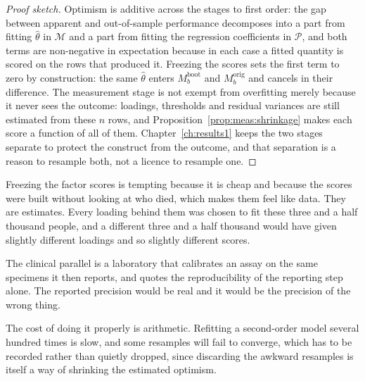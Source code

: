 \begin{proof}[Proof sketch]
Optimism is additive across the stages to first order: the gap between apparent
and out-of-sample performance decomposes into a part from fitting
$\widehat\theta$ in $\mathcal M$ and a part from fitting the regression
coefficients in $\mathcal P$, and both terms are non-negative in expectation
because in each case a fitted quantity is scored on the rows that produced it.
Freezing the scores sets the first term to zero by construction: the same
$\widehat\theta$ enters $M_b^{\mathrm{boot}}$ and $M_b^{\mathrm{orig}}$ and
cancels in their difference. The measurement stage is not exempt from
overfitting merely because it never sees the outcome: loadings, thresholds and
residual variances are still estimated from these $n$ rows, and
Proposition~\ref{prop:meas:shrinkage} makes each score a function of all of
them. Chapter~\ref{ch:results1} keeps the two stages separate to protect the
construct from the outcome, and that separation is a reason to resample both,
not a licence to resample one.
\end{proof}

\begin{reading}
Freezing the factor scores is tempting because it is cheap and because the
scores were built without looking at who died, which makes them feel like
data. They are estimates. Every loading behind them was
chosen to fit these three and a half thousand people, and a different three and
a half thousand would have given slightly different loadings and so slightly
different scores.

The clinical parallel is a laboratory that calibrates an assay on the same
specimens it then reports, and quotes the reproducibility of the reporting step
alone. The reported precision would be real and it would be the precision of
the wrong thing.

The cost of doing it properly is arithmetic. Refitting a second-order model
several hundred times is slow, and some resamples will fail to converge, which
has to be recorded rather than quietly dropped, since discarding the awkward
resamples is itself a way of shrinking the estimated optimism.
\end{reading}

